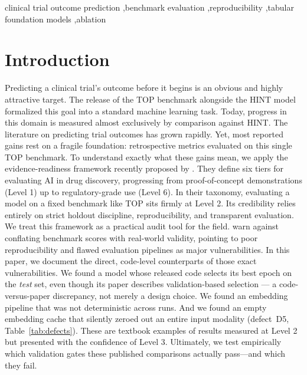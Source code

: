 \documentclass[a4paper,fleqn]{cas-sc}
\begin{document}
\begin{keywords}
clinical trial outcome prediction \sep benchmark evaluation \sep reproducibility \sep tabular foundation models \sep ablation
\end{keywords}
\maketitle
\section{Introduction}
\label{sec:intro}
Predicting a clinical trial's outcome before it begins is an obvious and highly attractive target. The release of the TOP benchmark alongside the HINT model \citep{fu2022hint} formalized this goal into a standard machine learning task. Today, progress in this domain is measured almost exclusively by comparison against HINT.
The literature on predicting trial outcomes has grown rapidly. Yet, most reported gains rest on a fragile foundation: retrospective metrics evaluated on this single TOP benchmark. To understand exactly what these gains mean, we apply the evidence-readiness framework recently proposed by \citet{yang2026large}. They define six tiers for evaluating AI in drug discovery, progressing from proof-of-concept demonstrations (Level 1) up to regulatory-grade use (Level 6). In their taxonomy, evaluating a model on a fixed benchmark like TOP sits firmly at Level 2. Its credibility relies entirely on strict holdout discipline, reproducibility, and transparent evaluation.
We treat this framework as a practical audit tool for the field. \citet{yang2026large} warn against conflating benchmark scores with real-world validity, pointing to poor reproducibility and flawed evaluation pipelines as major vulnerabilities. In this paper, we document the direct, code-level counterparts of those exact vulnerabilities. We found a model whose released code selects its best epoch on the \emph{test} set, even though its paper describes validation-based selection --- a code-versus-paper discrepancy, not merely a design choice. We found an embedding pipeline that was not deterministic across runs. And we found an empty embedding cache that silently zeroed out an entire input modality (defect~D5, Table~\ref{tab:defects}). These are textbook examples of results measured at Level 2 but presented with the confidence of Level 3. Ultimately, we test empirically which validation gates these published comparisons actually pass---and which they fail.
\end{document}
